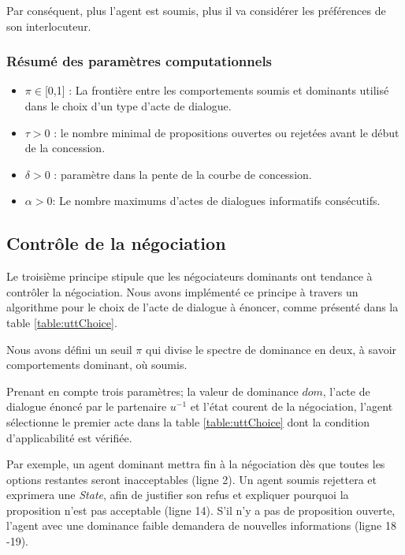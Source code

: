 	Par conséquent, plus l'agent est soumis, plus il va considérer les préférences de son interlocuteur.
	
	\subsubsection*{Résumé des paramètres computationnels}
	\begin{itemize}[noitemsep]
		
		\item $\pi \in $[0,1] : La frontière entre  les comportements soumis et dominants utilisé dans le choix d'un type d'acte de dialogue.
		\item $\tau > 0$ : le nombre minimal de propositions ouvertes ou rejetées avant le début de la concession.
		\item $\delta > 0$ : paramètre dans la pente de la courbe de concession.
		\item $\alpha> 0$: Le nombre maximums d'actes de dialogues informatifs consécutifs.
	\end{itemize}
	
	\subsection{Contrôle de la négociation}
	\label{chp4:controle}
	
	Le troisième principe stipule que les négociateurs dominants ont tendance à contrôler la négociation.
	Nous avons implémenté ce principe à travers un algorithme pour le choix de l'acte de dialogue à énoncer, comme présenté dans la table \ref{table:uttChoice}.
	
	Nous avons défini un seuil $\pi$  qui divise le spectre de dominance en deux, à savoir comportements dominant, où soumis.
	
	Prenant en compte trois paramètres; la valeur de dominance $dom$, l'acte de dialogue énoncé par le partenaire $u^{-1}$ et l'état courent de la négociation, l'agent sélectionne le premier acte dans la table \ref{table:uttChoice} dont la condition d'applicabilité est vérifiée.  
	
	
	Par exemple, un agent dominant mettra fin à la négociation dès que toutes les options restantes seront inacceptables (ligne 2). Un agent soumis rejettera et exprimera une \emph{State}, afin de justifier son refus et expliquer pourquoi la proposition n'est pas acceptable (ligne 14). S'il n'y a pas de proposition ouverte, l'agent avec une dominance faible demandera de nouvelles informations (ligne 18 -19).
	
